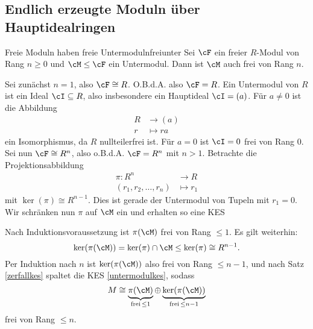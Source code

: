 \subsection{Endlich erzeugte Moduln über Hauptidealringen}
\label{subsec:endlmodulnhir}

\begin{lemma}{Freie Moduln haben freie Untermoduln}{freiunter}
Sei $\cF$ ein freier $R$-Modul von Rang $n \geq 0$ und $\cM \leq \cF$ ein Untermodul. Dann ist $\cM$ auch frei von Rang $n$.
\end{lemma}
\begin{beweis}
Sei zunächst $n=1$, also $\cF \cong R$. O.B.d.A. also $\cF = R$. Ein Untermodul von $R$ ist ein Ideal $\cI \sub R$, also insbesondere ein Hauptideal $\cI = (a)$. Für $a \neq 0$ ist die Abbildung
\begin{equation}
\begin{split}
R &\to (a) \\
r &\mapsto ra
\end{split}
\end{equation}
ein Isomorphismus, da $R$ nullteilerfrei ist. Für $a=0$ ist $\cI = 0$ frei von Rang $0$. Sei nun $\cF \cong R^n$, also o.B.d.A. $\cF = R^n$ mit $n>1$. Betrachte die Projektionsabbildung
\begin{equation}
\begin{split}
\pi: R^n &\to R\\
(r_1, r_2, \dots, r_n) &\mapsto r_1
\end{split}
\end{equation}
mit $\ker(\pi) \cong R^{n-1}$. Dies ist gerade der Untermodul von Tupeln mit $r_1=0$. Wir schränken nun $\pi$ auf $\cM$ ein und erhalten so eine KES
\begin{center}
\end{center}
Nach Induktionsvoraussetzung ist $\pi(\cM)$ frei von Rang $\leq 1$. Es gilt weiterhin:
\begin{equation}
\ker(\pi(\cM)) = \ker(\pi) \cap \cM \leq \ker(\pi) \cong R^{n-1}.
\end{equation}
Per Induktion nach $n$ ist $\ker(\pi(\cM))$ also frei von Rang $\leq n-1$, und nach Satz \ref{zerfallkes} spaltet die KES \ref{untermodulkes}, sodass 
\begin{equation}
M \cong \underbrace{\pi(\cM)}_{\text{frei} \, \leq 1} \oplus \underbrace{\ker(\pi(\cM))}_{\text{frei} \, \leq n-1}
\end{equation}
frei von Rang $\leq n$.
\end{beweis}
